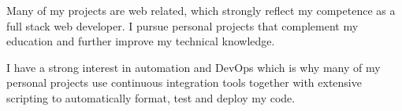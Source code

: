 
Many of my projects are web related, which strongly reflect my competence as a full stack web developer. I pursue personal projects that complement my education and further improve my technical knowledge.

\hfill\break

I have a strong interest in automation and DevOps which is why many of my personal projects use continuous integration tools together with extensive scripting to automatically format, test and deploy my code.
